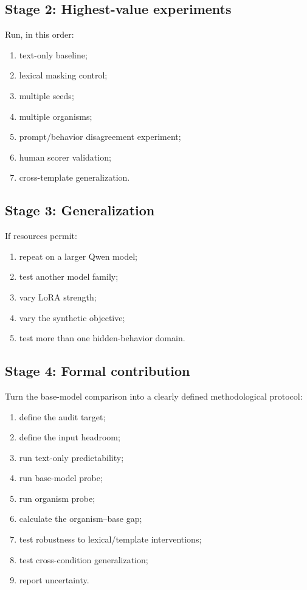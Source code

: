 \documentclass[11pt,a4paper]{article}
\begin{document}
\subsection{Stage 2: Highest-value experiments}

Run, in this order:

\begin{enumerate}
    \item text-only baseline;
    \item lexical masking control;
    \item multiple seeds;
    \item multiple organisms;
    \item prompt/behavior disagreement experiment;
    \item human scorer validation;
    \item cross-template generalization.
\end{enumerate}

\subsection{Stage 3: Generalization}

If resources permit:

\begin{enumerate}
    \item repeat on a larger Qwen model;
    \item test another model family;
    \item vary LoRA strength;
    \item vary the synthetic objective;
    \item test more than one hidden-behavior domain.
\end{enumerate}

\subsection{Stage 4: Formal contribution}

Turn the base-model comparison into a clearly defined methodological protocol:

\begin{enumerate}
    \item define the audit target;
    \item define the input headroom;
    \item run text-only predictability;
    \item run base-model probe;
    \item run organism probe;
    \item calculate the organism--base gap;
    \item test robustness to lexical/template interventions;
    \item test cross-condition generalization;
    \item report uncertainty.
\end{enumerate}
\end{document}
